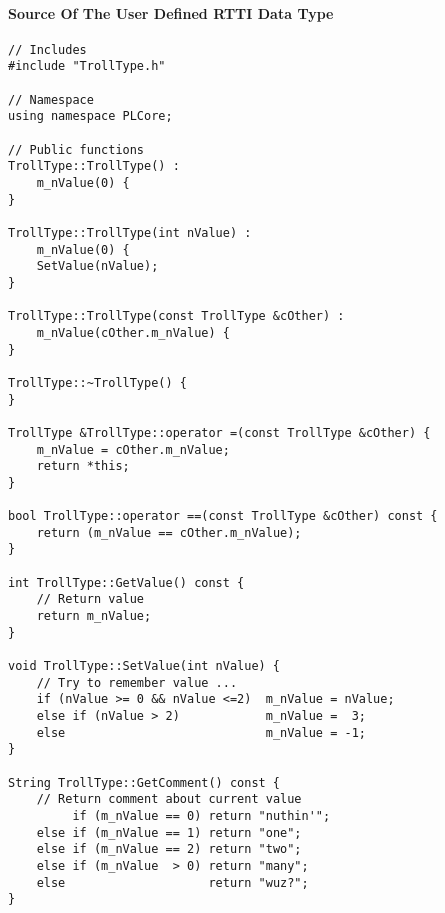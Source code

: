 \paragraph{Source Of The User Defined RTTI Data Type}
\begin{lstlisting}[label=Code:UserDefinedRTTIDataTypeSource,caption={Source of the user defined RTTI data type}]
// Includes
#include "TrollType.h"

// Namespace
using namespace PLCore;

// Public functions
TrollType::TrollType() :
	m_nValue(0) {
}

TrollType::TrollType(int nValue) :
	m_nValue(0) {
	SetValue(nValue);
}

TrollType::TrollType(const TrollType &cOther) :
	m_nValue(cOther.m_nValue) {
}

TrollType::~TrollType() {
}

TrollType &TrollType::operator =(const TrollType &cOther) {
	m_nValue = cOther.m_nValue;
	return *this;
}

bool TrollType::operator ==(const TrollType &cOther) const {
	return (m_nValue == cOther.m_nValue);
}

int TrollType::GetValue() const {
	// Return value
	return m_nValue;
}

void TrollType::SetValue(int nValue) {
	// Try to remember value ...
	if (nValue >= 0 && nValue <=2)	m_nValue = nValue;
	else if (nValue > 2)			m_nValue =  3;
	else							m_nValue = -1;
}

String TrollType::GetComment() const {
	// Return comment about current value
		 if (m_nValue == 0)	return "nuthin'";
	else if (m_nValue == 1)	return "one";
	else if (m_nValue == 2)	return "two";
	else if (m_nValue  > 0)	return "many";
	else					return "wuz?";
}
\end{lstlisting}
